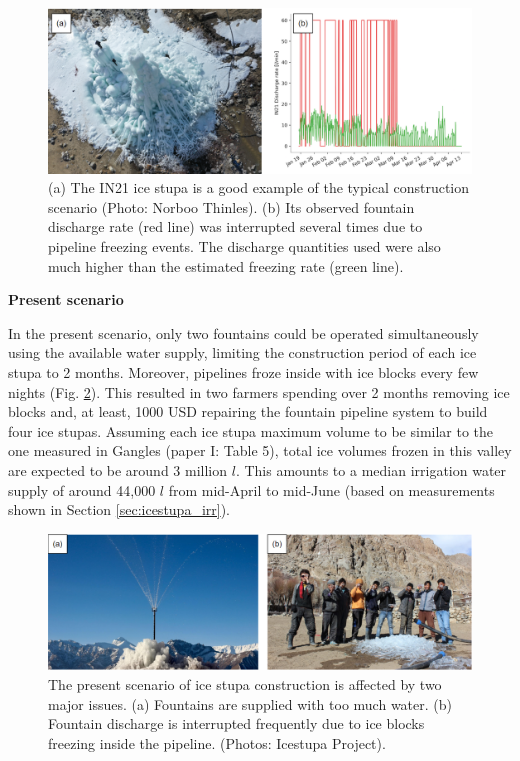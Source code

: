 \begin{figure}[htb]
	\includegraphics[width=\textwidth]{figs/gangles_data}

  \caption{(a) The IN21 ice stupa is a good example of the typical construction scenario (Photo: Norboo
  Thinles). (b) Its observed fountain discharge rate (red line) was interrupted several times due to pipeline
freezing events. The discharge quantities used were also much higher than the estimated freezing rate (green
line). }

	\label{fig:gangles_data}
\end{figure}

\textbf{Present scenario}

In the present scenario, only two fountains could be operated simultaneously using the available water
supply, limiting the construction period of each ice stupa to 2 months. Moreover, pipelines froze
inside with ice blocks every few nights (Fig. \ref{fig:issues}). This resulted in two farmers spending over 2 months removing ice blocks and, at least, 1000 USD repairing the fountain pipeline system to build
four ice stupas. Assuming each ice stupa maximum volume to be similar to the one measured in Gangles (paper I:
Table 5), total ice volumes frozen in this valley are expected to be around 3 million $l$. This amounts to
a median irrigation water supply of around 44,000 $l$ from mid-April to mid-June (based on measurements
shown in Section \ref{sec:icestupa_irr}).

\begin{figure}[htb]
	\includegraphics[width=\textwidth]{figs/construction_issues}

  \caption{The present scenario of ice stupa construction is affected by two major issues. (a) Fountains are
  supplied with too much water. (b) Fountain discharge is interrupted frequently due to ice blocks freezing
  inside the pipeline. (Photos: Icestupa Project).}

	\label{fig:issues}
\end{figure}

